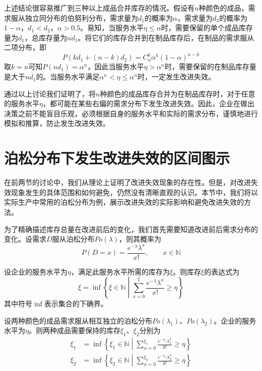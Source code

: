 上述结论很容易推广到三种以上成品合并库存的情况。假设有$n$种颜色的成品，需求服从独立同分布的伯努利分布，需求量为$d_1$的概率为$\alpha$，需求量为$d_2$的概率为$1-\alpha$，$d_1 < d_2$，$\alpha > 0.5$。易知，当服务水平$\eta \leq \alpha$时，需要保留的单个成品库存量为$d_1$，总库存量为$nd_1$。将它们的库存合并到在制品库存后，在制品的需求服从二项分布，即
\[
P(kd_1+(n-k)d_2) = C_{n}^{k}\alpha^k(1-\alpha)^{n-k}
\]
取$k=n$可知$P(nd_1)=\alpha^n$，因此当服务水平$\eta > \alpha^n$时，需要保留的在制品库存量是大于$nd_1$的。当服务水平满足$\alpha^n < \eta \leq \alpha^n$时，一定发生改进失效。

通过以上讨论我们证明了，将$n$种颜色的成品库存合并为在制品库存时，对于任意的服务水平$\eta$，都可能在某些右偏的需求分布下发生改进失效。因此，企业在做出决策之前不能盲目乐观，必须根据自身的服务水平和实际的需求分布，谨慎地进行模拟和推算，防止发生改进失效。








\section{泊松分布下发生改进失效的区间图示}

在前两节的讨论中，我们从理论上证明了改进失效现象的存在性。但是，对改进失效现象发生的具体范围和如何避免，仍然没有清晰直观的认识。本节中，我们将以实际生产中常用的泊松分布为例，展示改进失效的实际影响和避免改进失效的方法。

为了精确描述库存总量在改进前后的变化，我们首先需要知道改进前后需求分布的变化。设需求$D$服从泊松分布$Po(\lambda)$，则其概率为
\[
P(D=x) = \frac{e^{-\lambda}\lambda^x}{x!},\qquad x\in\mathbb{N}
\]

设企业的服务水平为$\eta$，满足此服务水平所需的库存为$\xi$。则库存$\xi$的表达式为
\begin{equation}
\xi = \inf\left\{\xi\in\mathbb{N}\middle|\sum_{x=0}^{\xi}\frac{e^{-\lambda}\lambda^x}{x!}\geq \eta\right\}
\end{equation}
其中符号$\inf$表示集合的下确界。

设两种颜色的成品需求服从相互独立的泊松分布$Po(\lambda_1)$、$Po(\lambda_2)$。企业的服务水平为$\eta$。则两种成品需要保持的库存$\xi_1$、$\xi_2$分别为
\begin{align}
\xi_1 &= \inf\left\{\xi_1\in\mathbb{N}\middle|\sum_{x=0}^{\xi_1}\frac{e^{-\lambda_1}\lambda_1^x}{k!}\geq \eta\right\} \label{eq:成品库存_泊松1}\\
\xi_2 &= \inf\left\{\xi_2\in\mathbb{N}\middle|\sum_{x=0}^{\xi_2}\frac{e^{-\lambda_2}\lambda_2^x}{k!}\geq \eta\right\} \label{eq:成品库存_泊松2}
\end{align}

